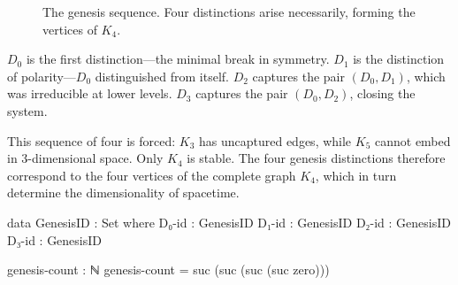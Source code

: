 \documentclass[11pt,a4paper]{book}
\begin{document}
\begin{figure}[h]
\centering
{}
\caption{The genesis sequence. Four distinctions arise necessarily, forming the vertices of $K_4$.}
\label{fig:genesis-sequence}
\end{figure}

$D_0$ is the first distinction---the minimal break in symmetry.
$D_1$ is the distinction of polarity---$D_0$ distinguished from itself.
$D_2$ captures the pair $(D_0, D_1)$, which was irreducible at lower levels.
$D_3$ captures the pair $(D_0, D_2)$, closing the system.

This sequence of four is forced: $K_3$ has uncaptured edges, while $K_5$ cannot embed in 3-dimensional space. Only $K_4$ is stable.
The four genesis distinctions therefore correspond to the four vertices of the complete graph $K_4$, which in turn determine the dimensionality of spacetime.

\begin{code}
data GenesisID : Set where
  D₀-id : GenesisID
  D₁-id : GenesisID
  D₂-id : GenesisID
  D₃-id : GenesisID

genesis-count : ℕ
genesis-count = suc (suc (suc (suc zero)))
\end{code}
\end{document}
